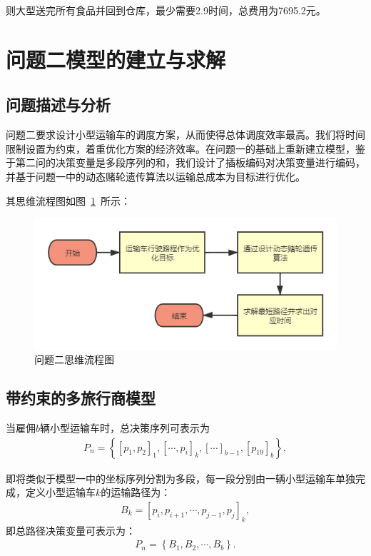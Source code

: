 \documentclass{whutmod}
\begin{document}
     则大型送完所有食品并回到仓库，最少需要2.9时间，总费用为7695.2元。
     
 \section{问题二模型的建立与求解}
 
\subsection{问题描述与分析}
问题二要求设计小型运输车的调度方案，从而使得总体调度效率最高。我们将时间限制设置为约束，着重优化方案的经济效率。在问题一的基础上重新建立模型，鉴于第二问的决策变量是多段序列的和，我们设计了插板编码对决策变量进行编码，并基于问题一中的动态赌轮遗传算法以运输总成本为目标进行优化。

    其思维流程图如图~\ref{lssssct}~所示：

\begin{figure}[H]
	\centering
	\includegraphics[width=\textwidth]{figures/abab.png}
	\caption{问题二思维流程图}\label{lssssct}
\end{figure}

\subsection{带约束的多旅行商模型}
当雇佣$b$辆小型运输车时，总决策序列可表示为
\begin{gather*}
P_n=\left \{[p_{1},p_{2}]_1,[\cdots,p_{i}]_k,[\cdots]_{b-1},[p_{19}]_b\right \},
\end{gather*}

即将类似于模型一中的坐标序列分割为多段，每一段分别由一辆小型运输车单独完成，定义小型运输车$k$的运输路径为：
\begin{gather*}
B_k=[p_{i},p_{i+1},\cdots,p_{j-1},p_{j}]_k,
\end{gather*}
即总路径决策变量可表示为：
\begin{gather*}
P_n=\left \{B_1,B_2,\cdots,B_b\right \}.
\end{gather*}
\end{document}
